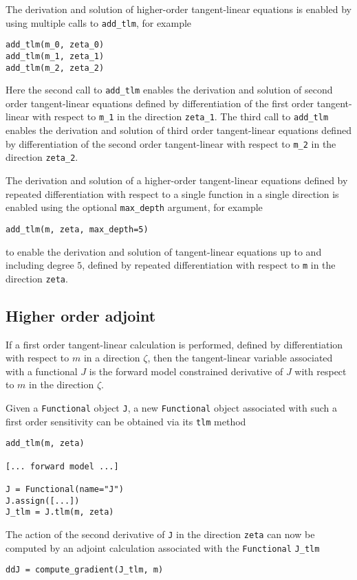 \documentclass[11pt]{article}
\begin{document}
The derivation and solution of higher-order tangent-linear equations is enabled
by using multiple calls to \texttt{add\_tlm}, for example
\begin{lstlisting}
add_tlm(m_0, zeta_0)
add_tlm(m_1, zeta_1)
add_tlm(m_2, zeta_2)
\end{lstlisting}
Here the second call to \texttt{add\_tlm} enables the derivation and solution
of second order tangent-linear equations defined by differentiation of the
first order tangent-linear with respect to \texttt{m\_1} in the direction
\texttt{zeta\_1}. The third call to \texttt{add\_tlm} enables the derivation
and solution of third order tangent-linear equations defined by differentiation
of the second order tangent-linear with respect to \texttt{m\_2} in the
direction \texttt{zeta\_2}.

The derivation and solution of a higher-order tangent-linear equations defined
by repeated differentiation with respect to a single function in a single
direction is enabled using the optional \texttt{max\_depth} argument, for
example
\begin{lstlisting}
add_tlm(m, zeta, max_depth=5)
\end{lstlisting}
to enable the derivation and solution of tangent-linear equations up to and
including degree $5$, defined by repeated differentiation with respect to
\texttt{m} in the direction \texttt{zeta}.

\subsection{Higher order adjoint}\label{sect:higher_order_adjoint}

If a first order tangent-linear calculation is performed, defined by
differentiation with respect to $m$ in a direction $\zeta$, then the
tangent-linear variable associated with a functional $J$ is the forward model
constrained derivative of $J$ with respect to $m$ in the direction $\zeta$.

Given a \texttt{Functional} object \texttt{J}, a new \texttt{Functional} object
associated with such a first order sensitivity can be obtained via its
\texttt{tlm} method
\begin{lstlisting}
add_tlm(m, zeta)

[... forward model ...]

J = Functional(name="J")
J.assign([...])
J_tlm = J.tlm(m, zeta)
\end{lstlisting}
The action of the second derivative of \texttt{J} in the direction
\texttt{zeta} can now be computed by an adjoint calculation associated with the
\texttt{Functional} \texttt{J\_tlm}
\begin{lstlisting}
ddJ = compute_gradient(J_tlm, m)
\end{lstlisting}
\end{document}
